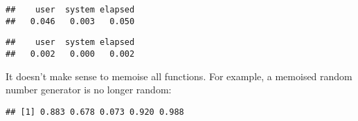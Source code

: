 \begin{Shaded}
\begin{Highlighting}[]
\StringTok{ }\NormalTok{(}
  \OperatorTok{<}\StringTok{ }\NormalTok{) }\NormalTok{(}\NormalTok{)}
  \OperatorTok{-}\StringTok{ }\NormalTok{) }\OperatorTok{+}\StringTok{ }\OperatorTok{-}\StringTok{ }\NormalTok{)}
\NormalTok{\})}
\NormalTok{(}\NormalTok{(}\NormalTok{))}
\end{Highlighting}
\end{Shaded}

\begin{verbatim}
##    user  system elapsed 
##   0.046   0.003   0.050
\end{verbatim}

\begin{Shaded}
\begin{Highlighting}[]
\NormalTok{(}\NormalTok{(}\NormalTok{))}
\end{Highlighting}
\end{Shaded}

\begin{verbatim}
##    user  system elapsed 
##   0.002   0.000   0.002
\end{verbatim}

It doesn't make sense to memoise all functions. For example, a memoised
random number generator is no longer random:

\begin{Shaded}
\begin{Highlighting}[]
\StringTok{ }
\NormalTok{(}\NormalTok{)}
\end{Highlighting}
\end{Shaded}

\begin{verbatim}
## [1] 0.883 0.678 0.073 0.920 0.988
\end{verbatim}

\begin{Shaded}
\begin{Highlighting}[]
\NormalTok{(}\NormalTok{)}
\end{Highlighting}
\end{Shaded}

